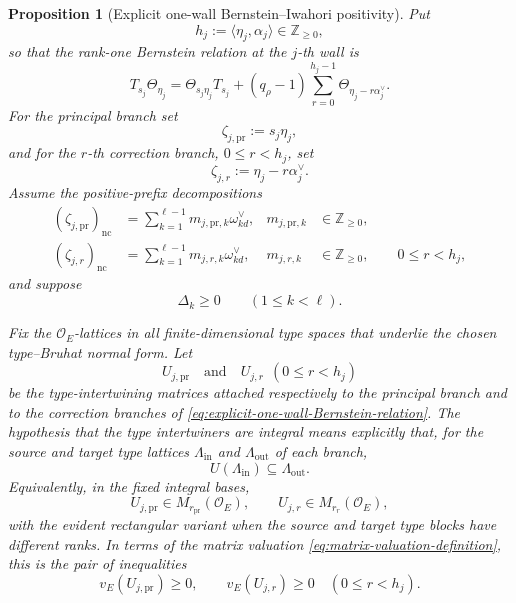 \documentclass[10pt,a4paper]{amsart}
\newtheorem{proposition}{Proposition}
\newcommand{\Ocoeff}{\mathcal O_E}
\begin{document}
\begin{proposition}[Explicit one-wall Bernstein--Iwahori positivity]
\label{prop:one-wall-Bernstein-Iwahori-positivity}
Put
\[
 h_j:=\langle\eta_j,\alpha_j\rangle\in\mathbb Z_{\geq0},
\]
so that the rank-one Bernstein relation at the \(j\)-th wall is
\begin{equation}\label{eq:explicit-one-wall-Bernstein-relation}
 T_{s_j}\Theta_{\eta_j}
 =
 \Theta_{s_j\eta_j}T_{s_j}
 +(q_\rho-1)
 \sum_{r=0}^{h_j-1}
 \Theta_{\eta_j-r\alpha_j^\vee}.
\end{equation}
For the principal branch set
\[
 \zeta_{j,\mathrm{pr}}:=s_j\eta_j,
\]
and for the \(r\)-th correction branch, \(0\leq r<h_j\), set
\[
 \zeta_{j,r}:=\eta_j-r\alpha_j^\vee.
\]
Assume the positive-prefix decompositions
\begin{align}
 (\zeta_{j,\mathrm{pr}})_{\mathrm{nc}}
 &=
 \sum_{k=1}^{\ell-1}
 m_{j,\mathrm{pr},k}\omega_{kd}^\vee,
 &
 m_{j,\mathrm{pr},k}&\in\mathbb Z_{\geq0},
 \label{eq:one-wall-principal-prefix-explicit}\\
 (\zeta_{j,r})_{\mathrm{nc}}
 &=
 \sum_{k=1}^{\ell-1}
 m_{j,r,k}\omega_{kd}^\vee,
 &
 m_{j,r,k}&\in\mathbb Z_{\geq0},
 \qquad 0\leq r<h_j,
 \label{eq:one-wall-correction-prefix-explicit}
\end{align}
and suppose
\begin{equation}\label{eq:one-wall-defects-nonnegative}
 \Delta_k\geq0
 \qquad(1\leq k<\ell).
\end{equation}

Fix the \(\Ocoeff\)-lattices in all finite-dimensional type spaces that
underlie the chosen type--Bruhat normal form.  Let
\[
 U_{j,\mathrm{pr}}
 \quad\text{and}\quad
 U_{j,r}\ \ (0\leq r<h_j)
\]
be the type-intertwining matrices attached respectively to the principal
branch and to the correction branches of
\eqref{eq:explicit-one-wall-Bernstein-relation}.  The hypothesis that the
type intertwiners are \emph{integral} means explicitly that, for the source
and target type lattices \(\Lambda_{\mathrm{in}}\) and
\(\Lambda_{\mathrm{out}}\) of each branch,
\begin{equation}\label{eq:one-wall-type-intertwiner-lattice-integrality}
 U(\Lambda_{\mathrm{in}})
 \subseteq
 \Lambda_{\mathrm{out}}.
\end{equation}
Equivalently, in the fixed integral bases,
\begin{equation}\label{eq:one-wall-type-intertwiner-matrix-integrality}
 U_{j,\mathrm{pr}}\in M_{r_{\mathrm{pr}}}(\Ocoeff),
 \qquad
 U_{j,r}\in M_{r_r}(\Ocoeff),
\end{equation}
with the evident rectangular variant when the source and target type blocks
have different ranks.  In terms of the matrix valuation
\eqref{eq:matrix-valuation-definition}, this is the pair of inequalities
\begin{equation}\label{eq:one-wall-type-intertwiner-valuation-integrality}
 v_E(U_{j,\mathrm{pr}})\geq0,
 \qquad
 v_E(U_{j,r})\geq0
 \quad(0\leq r<h_j).
\end{equation}


\end{proposition}
\end{document}
